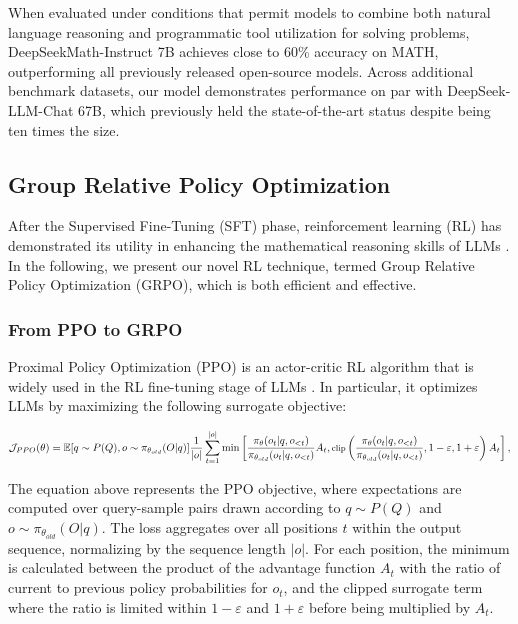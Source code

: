 \begin{itemize}[topsep=0pt]
When evaluated under conditions that permit models to combine both natural language reasoning and programmatic tool utilization for solving problems, DeepSeekMath-Instruct 7B achieves close to 60\% accuracy on MATH, outperforming all previously released open-source models. Across additional benchmark datasets, our model demonstrates performance on par with DeepSeek-LLM-Chat 67B, which previously held the state-of-the-art status despite being ten times the size.

\subsection{Group Relative Policy Optimization} After the Supervised Fine-Tuning (SFT) phase, reinforcement learning (RL) has demonstrated its utility in enhancing the mathematical reasoning skills of LLMs \citep{wang2023math,wizardmath}. In the following, we present our novel RL technique, termed Group Relative Policy Optimization (GRPO), which is both efficient and effective.

\subsubsection{From PPO to GRPO} Proximal Policy Optimization (PPO) \citep{schulman2017proximal} is an actor-critic RL algorithm that is widely used in the RL fine-tuning stage of LLMs \citep{ouyang2022training}. In particular, it optimizes LLMs by maximizing the following surrogate objective:

\begin{equation}
\footnotesize
    \mathcal{J}_{PPO}(\theta) = \mathbb{E}{[q \sim P(Q), o \sim \pi_{\theta_{old}}(O|q)]} \frac{1}{|o|} \sum_{t=1}^{|o|} \min \left[ \frac{\pi_\theta(o_{t} | q, o_{<t})}{\pi_{\theta_{old}}(o_{t} | q, o_{<t})} A_{t}, \text{clip} \left( \frac{\pi_\theta(o_{t} | q, o_{<t})}{\pi_{\theta_{old}}(o_{t} | q, o_{<t})}, 1 - \varepsilon, 1 + \varepsilon \right)  A_{t} \right] ,
\end{equation}

The equation above represents the PPO objective, where expectations are computed over query-sample pairs drawn according to $q \sim P(Q)$ and $o \sim \pi_{\theta_{old}}(O|q)$. The loss aggregates over all positions $t$ within the output sequence, normalizing by the sequence length $|o|$. For each position, the minimum is calculated between the product of the advantage function $A_t$ with the ratio of current to previous policy probabilities for $o_t$, and the clipped surrogate term where the ratio is limited within $1-\varepsilon$ and $1+\varepsilon$ before being multiplied by $A_t$.


\end{itemize}
